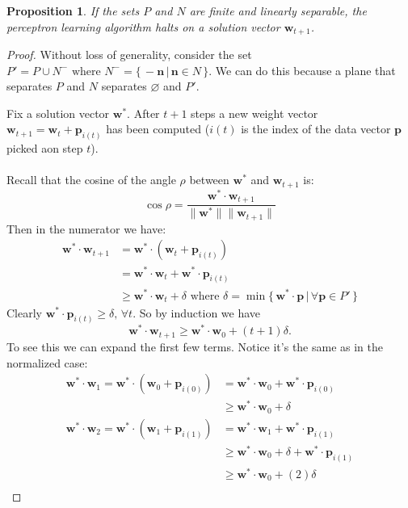 \documentclass[12pt]{article}
\newcommand{\myvec}[1][v]{\mathbf{#1}}
\newcommand{\vecsub}[2]{\myvec[#1]_{#2}}
\newcommand{\vecsup}[2]{\myvec[#1]^{#2}}
\newcommand{\wsub}[1]{\vecsub{w}{#1}}
\newcommand{\wsubt}{\wsub{t}}
\newcommand{\wsubtt}{\wsub{t+1}}
\newcommand{\wfix}{\vecsup{w}{\ast}}
\newcommand{\psub}[1]{\vecsub{p}{i(#1)}}
\newcommand{\psubt}{\psub{t}}
\newtheorem{proposition}{Proposition}
\begin{document}
\begin{proposition}
If the sets $P$ and $N$ are finite and linearly separable, the perceptron learning algorithm halts on a solution vector $\wsubtt$.
\end{proposition}

\begin{proof}
Without loss of generality, consider the set $P' = P \cup N^{-} \text{ where } N^{-} = \{\,-\myvec[n] \,|\,\myvec[n] \in N\,\}$.  We can do this because a plane that separates $P$ and $N$ separates $\varnothing$ and $P'$.\par
Fix a solution vector $\wfix$.  After $t+1$ steps a new weight vector $\wsubtt = \wsubt + \psubt$ has been computed ($i(t)$ is the index of the data vector $\myvec[p]$ picked aon step $t$).
\\\\
Recall that the cosine of the angle $\rho$ between $\wfix$ and $\wsubtt$ is:
\begin{equation}
    \cos{\rho} = \frac{\wfix \cdot \wsubtt}{\|\wfix\|\|\wsubtt\|}
\end{equation}
Then in the numerator we have:
\begin{align*}
    \wfix \cdot \wsubtt & = \wfix \cdot (\wsubt + \psubt) \\
    & = \wfix \cdot \wsubt + \wfix \cdot \psubt \\
    & \geq \wfix \cdot \wsubt + \delta \text{ where } \delta = \min\{\,\wfix \cdot \myvec[p] \,|\, \forall \myvec[p] \in P'\,\}
\end{align*}
Clearly $\wfix \cdot \psubt \geq \delta, \,\forall t$.  So by induction we have 
\begin{equation}
    \wfix \cdot \wsubtt \geq \wfix \cdot \wsub{0} + (t+1)\delta.
\end{equation}
To see this we can expand the first few terms.  Notice it's the same as in the normalized case:\\
\begin{align*}
    \wfix \cdot \wsub{1} = \wfix \cdot (\wsub{0} + \psub{0}) & = \wfix \cdot \wsub{0} + \wfix \cdot \psub{0}\\
    &\geq \wfix \cdot \wsub{0} + \delta\\
    \wfix \cdot \wsub{2} = \wfix \cdot (\wsub{1} + \psub{1}) & = \wfix \cdot \wsub{1} + \wfix \cdot \psub{1}\\
    &\geq \wfix \cdot \wsub{0} + \delta + \wfix \cdot \psub{1}\\
    &\geq \wfix \cdot \wsub{0} + (2)\delta\\

\end{align*}
\end{proof}
\end{document}

